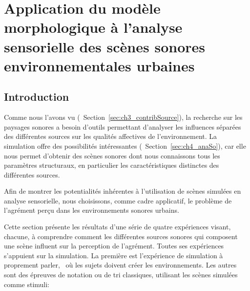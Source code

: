 \chapter[Application du modèle à l'analyse sensorielle]{Application du modèle morphologique à l'analyse sensorielle des scènes sonores environnementales urbaines}\label{ch:psycho_xp}


\section{Introduction}

Comme nous l'avons vu (\cf~Section~\ref{sec:ch3_contribSource}), la recherche sur les paysages sonores a besoin d'outils permettant d'analyser les influences séparées des différentes sources sur les qualités affectives de l'environnement. La simulation offre des possibilités intéressantes (\cf~Section~\ref{sec:ch4_anaSo}), car elle nous permet d'obtenir des scènes sonores dont nous connaissons tous les paramètres structuraux, en particulier les caractéristiques distinctes des différentes sources. 
 
Afin de montrer les potentialités inhérentes à l'utilisation de scènes simulées en analyse sensorielle, nous choisissons, comme cadre applicatif, le problème de l'agrément perçu dans les environnements sonores urbains. 

Cette section présente les résultats d'une série de quatre expériences visant, chacune, à comprendre comment les différentes sources sonores qui composent une scène influent sur la perception de l'agrément. Toutes ses expériences s'appuient sur la simulation. La première est l'expérience de simulation à proprement parler, \ie~où les sujets doivent créer les environnements. Les autres sont des épreuves de notation ou de tri classiques, utilisant les scènes simulées comme stimuli:

